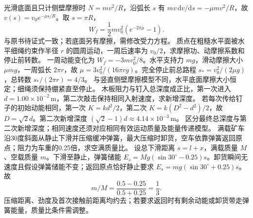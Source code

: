 \workings 光滑底面且只计侧壁摩擦时 $N=mv^2/R$，沿弧长 $s$ 有 $mv\,\mathrm dv/\mathrm ds=-\mu mv^2/R$，故 $v(s)=v_0e^{-\mu s/R}$。取 $s=\pi R$，
\[
W_f=\frac12mv_0^2(e^{-2\pi\mu}-1).
\]
\crosscheck 与原书待证式一致；若底面另有摩擦，需修改受力方程。
\problemtext 质点在粗糙水平面被水平细绳约束作半径 $r$ 的圆周运动，一周后速率为 $v_0/2$，求摩擦功、动摩擦系数和停止前转数。
\workings 一周动能变化为 $W_f=-3mv_0^2/8$。水平支持力 $mg$，滑动摩擦大小 $\mu mg$，一周弧长 $2\pi r$，故 $\mu=3v_0^2/(16\pi rg)$。完全停止前总路程 $s_*=v_0^2/(2\mu g)$，总转数 $s_*/(2\pi r)=4/3$。
\crosscheck 与竖直侧壁摩擦模型不同，水平底面摩擦大小恒定；细绳须保持绷紧直至停止。
\problemtext 木板阻力与钉入总深度成正比，第一次进入 $d=1.00\times10^{-2}\,\mathrm m$，第二次敲击保持相同入射速度，求新增深度。
\workings 若每次传给钉子的初始动能相同，第一次 $K=kd^2/2$，第二次 $K=k(D^2-d^2)/2$，故 $D=\sqrt2d$。第二次新增深度 $(\sqrt2-1)d\approx4.14\times10^{-3}\,\mathrm m$。
\crosscheck 区分最终总深度与第二次新增深度；相同速度还须对应相同有效运动质量及能量传递模型。
\problemtext 满载矿车沿30度斜面从静止下滑并压缩缓冲弹簧，最大压缩时卸货，空车依靠弹簧返回原点；阻力为车重的0.25倍，求空满质量比。
\workings 设总下滑距离 $s=l+x$，满载质量 $M$、空载质量 $m$。下滑至静止，弹簧储能 $E_s=Mg(\sin30^\circ-0.25)s$。卸货瞬间无速度且假设弹簧储能不变；返回原点恰好静止要求 $E_s=mg(\sin30^\circ+0.25)s$。故
\[
m/M=\frac{0.5-0.25}{0.5+0.25}=\frac13.
\]
\crosscheck 压缩距离、劲度及首次接触前距离均约去；若要求返回时有剩余动能或卸货带走弹簧能量，质量比条件需调整。
